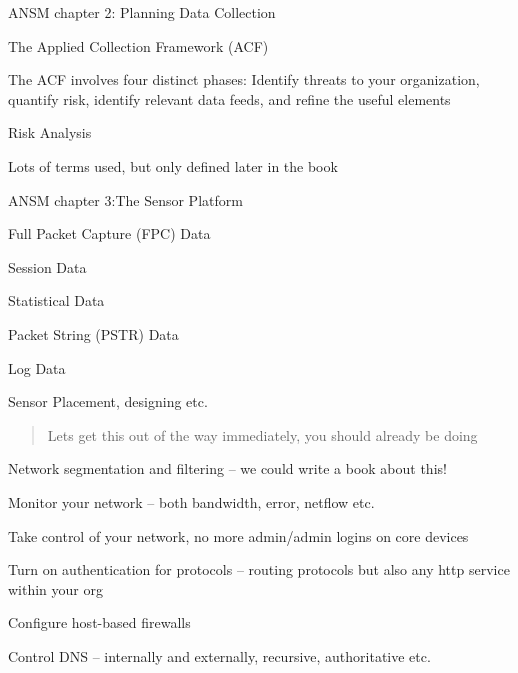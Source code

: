 \documentclass[Screen16to9,17pt]{foils}
\begin{document}


\begin{list1}
  \item ANSM chapter 2: Planning Data Collection
\begin{list2}
\item The Applied Collection Framework (ACF)
\item The ACF involves four distinct phases: Identify
threats to your organization, quantify risk, identify relevant data feeds, and refine the useful elements
\item Risk Analysis
\item Lots of terms used, but only defined later in the book
\end{list2}
\end{list1}


\begin{alltt}\footnotesize

\end{alltt}

\begin{list1}
\item ANSM chapter 3:The Sensor Platform
\begin{list2}
\item Full Packet Capture (FPC) Data
\item Session Data
\item Statistical Data
\item Packet String (PSTR) Data
\item Log Data
\item Sensor Placement, designing etc.
\end{list2}
\end{list1}






\begin{quote}
Lets get this out of the way immediately, you should already be doing
\end{quote}

\begin{list2}
\item Network segmentation and filtering -- we could write a book about this! {\myalert}
\item Monitor your network -- both bandwidth, error, netflow etc. {\myalert}
\item Take control of your network, no more admin/admin logins on core devices {\myalert}
\item Turn on authentication for protocols -- routing protocols but also any http service within your org {\myalert}
\item Configure host-based firewalls {\myalert}
\item Control DNS -- internally and externally, recursive, authoritative etc. {\myalert}
\end{list2}
\end{document}

